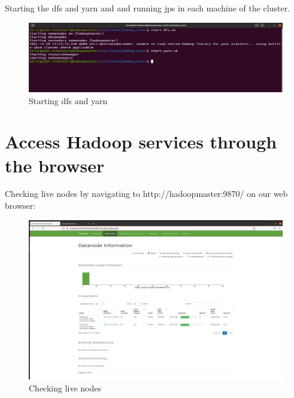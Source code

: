 \begin{spacing}{1.2}
\par Starting the dfs and yarn and and running jps in each machine of the cluster.
\\
\begin{figure}[!htb] 
\begin{center} 
\includegraphics[width=1\linewidth]{Big_Data/Hadoop/Multi-Nodes Cluster/Starting dfs and yarn} 
\end{center} 
\caption{Starting dfs and yarn} 
\end{figure} 
\FloatBarrier


\section{Access Hadoop services through the browser}

\par Checking live nodes by navigating to http://hadoopmaster:9870/ on our web browser: 
\\
\begin{figure}[!htb] 
\begin{center} 
\includegraphics[width=1\linewidth]{Big_Data/Hadoop/Multi-Nodes Cluster/Checking live nodes} 
\end{center} 
\caption{Checking live nodes} 
\end{figure} 
\FloatBarrier



\end{spacing}
